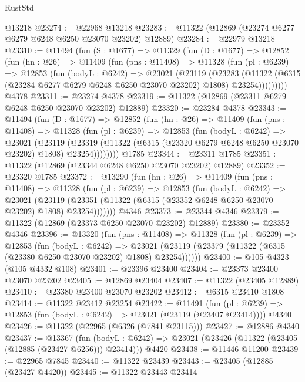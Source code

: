 \begin{lexlean}{RustStd}
\begin{coremodule}
    @13218
@23274 := @22968 @13218
@23283 := @11322 (@12869 (@23274 @6277 @6279 @6248 @6250 @23070 @23202) @12889)
@23284 := @22979 @13218
@23310 := @11494
    (fun (S : @1677) =>
    @11329
      (fun (D : @1677) =>
      @12852
        (fun (hn : @26) =>
        @11409
          (fun (pns : @11408) =>
          @11328
            (fun (pl : @6239) =>
            @12853
              (fun (bodyL : @6242) =>
              @23021
                (@23119
                  (@23283
                    (@11322
                      (@6315 (@23284 @6277 @6279 @6248 @6250 @23070 @23202) @1808)
                      @23254)))))))))
    @4378
@23311 := @23274 @4378
@23319 := @11322 (@12869 (@23311 @6279 @6248 @6250 @23070 @23202) @12889)
@23320 := @23284 @4378
@23343 := @11494
    (fun (D : @1677) =>
    @12852
      (fun (hn : @26) =>
      @11409
        (fun (pns : @11408) =>
        @11328
          (fun (pl : @6239) =>
          @12853
            (fun (bodyL : @6242) =>
            @23021
              (@23119
                (@23319
                  (@11322 (@6315 (@23320 @6279 @6248 @6250 @23070 @23202) @1808) @23254))))))))
    @1785
@23344 := @23311 @1785
@23351 := @11322 (@12869 (@23344 @6248 @6250 @23070 @23202) @12889)
@23352 := @23320 @1785
@23372 := @13290
    (fun (hn : @26) =>
    @11409
      (fun (pns : @11408) =>
      @11328
        (fun (pl : @6239) =>
        @12853
          (fun (bodyL : @6242) =>
          @23021
            (@23119 (@23351 (@11322 (@6315 (@23352 @6248 @6250 @23070 @23202) @1808) @23254)))))))
    @4346
@23373 := @23344 @4346
@23379 := @11322 (@12869 (@23373 @6250 @23070 @23202) @12889)
@23380 := @23352 @4346
@23396 := @13320
    (fun (pns : @11408) =>
    @11328
      (fun (pl : @6239) =>
      @12853
        (fun (bodyL : @6242) =>
        @23021 (@23119 (@23379 (@11322 (@6315 (@23380 @6250 @23070 @23202) @1808) @23254))))))
@23400 := @105 @4323 (@105 @4332 @108)
@23401 := @23396 @23400
@23404 := @23373 @23400 @23070 @23202
@23405 := @12869 @23404
@23407 := @11322 (@23405 @12889)
@23410 := @23380 @23400 @23070 @23202
@23412 := @6315 @23410 @1808
@23414 := @11322 @23412 @23254
@23422 := @11491
    (fun (pl : @6239) => @12853 (fun (bodyL : @6242) => @23021 (@23119 (@23407 @23414))))
    @4340
@23426 := @11322 (@22965 (@6326 (@7841 @23115)))
@23427 := @12886 @4340
@23437 := @13367
    (fun (bodyL : @6242) => @23021 (@23426 (@11322 (@23405 (@12885 (@23427 @6256))) @23414)))
    @4420
@23438 := @11446 @11200
@23439 := @22965 @7845
@23440 := @11322 @23439
@23443 := @23405 (@12885 (@23427 @4420))
@23445 := @11322 @23443 @23414

\end{coremodule}
\end{lexlean}
